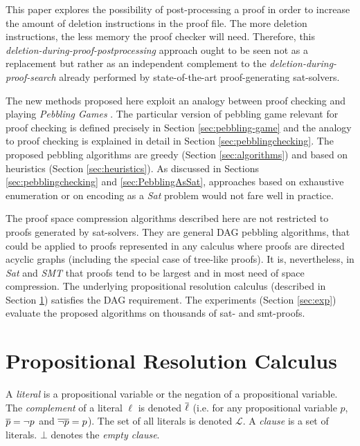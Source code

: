 \documentclass{llncs}
\begin{document}
This paper explores the possibility of post-processing a proof in order to increase the amount of deletion instructions in the proof file. The more deletion instructions, the less memory the proof checker will need. Therefore, this \emph{deletion-during-proof-postprocessing} approach ought to be seen not as a replacement but rather as an independent complement to the \emph{deletion-during-proof-search} already performed by state-of-the-art proof-generating sat-solvers.

The new methods proposed here exploit an analogy between proof checking and 
playing \emph{Pebbling Games} \cite{kasai1979classes,gilbert1980pebbling}. 
The particular version of pebbling game relevant for proof checking is defined precisely in Section \ref{sec:pebbling-game} and the analogy to proof checking is explained in detail in Section \ref{sec:pebblingchecking}. The proposed pebbling algorithms are greedy (Section \ref{sec:algorithms}) and based on heuristics (Section \ref{sec:heuristics}). As discussed in Sections \ref{sec:pebblingchecking} and \ref{sec:PebblingAsSat}, approaches based on exhaustive enumeration or on encoding as a \emph{Sat} problem would not fare well in practice.

The proof space compression algorithms described here are not restricted to proofs generated by sat-solvers. They are general DAG pebbling algorithms, that could be applied to proofs represented in any calculus where proofs are directed acyclic graphs (including the special case of tree-like proofs). It is, nevertheless, in \emph{Sat} and \emph{SMT} that proofs tend to be largest and in most need of space compression. The underlying propositional resolution calculus (described in Section \ref{sec:Resolution}) satisfies the DAG requirement. The experiments (Section \ref{sec:exp}) evaluate the proposed algorithms on thousands of sat- and smt-proofs.


\section{Propositional Resolution Calculus}
\label{sec:Resolution}

A \emph{literal} is a propositional variable or the negation of a propositional variable. The
\emph{complement} of a literal $\ell$ is denoted $\overline{\ell}$ (i.e. for any propositional variable $p$,
$\overline{p} = \neg p$ and $\overline{\neg p} = p$). The set of all literals is denoted $\mathcal{L}$. A
\emph{clause} is a set of literals. $\bot$ denotes the \emph{empty clause}.
\end{document}

